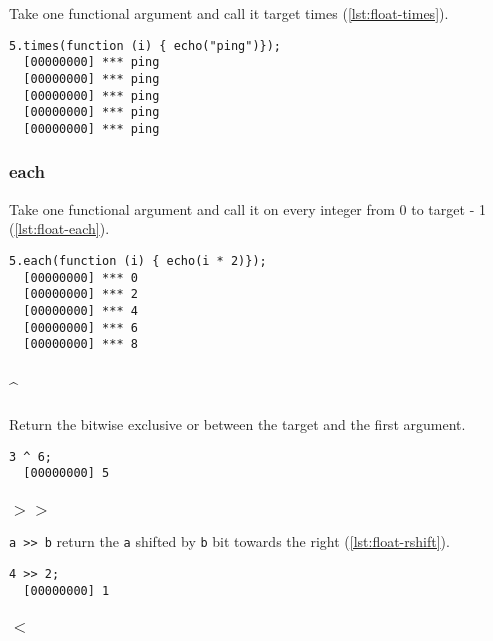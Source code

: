 Take one functional argument and call it target times (\autoref{lst:float-times}).

\begin{lstlisting}[caption=Float.times, label=lst:float-times,
  float=\floatposh]
  5.times(function (i) { echo("ping")});
  [00000000] *** ping
  [00000000] *** ping
  [00000000] *** ping
  [00000000] *** ping
  [00000000] *** ping
\end{lstlisting}

\subsubsection{each}

Take one functional argument and call it on every integer from 0 to
target - 1 (\autoref{lst:float-each}).

\begin{lstlisting}[caption=Float.each, label=lst:float-each,
  float=\floatposh]
  5.each(function (i) { echo(i * 2)});
  [00000000] *** 0
  [00000000] *** 2
  [00000000] *** 4
  [00000000] *** 6
  [00000000] *** 8
\end{lstlisting}

\subsubsection{\^{}}

Return the bitwise exclusive or between the target and the first argument.

\begin{lstlisting}[caption=Float.'\^{}', label=lst:float-bitxor,
  float=\floatposh]
  3 ^ 6;
  [00000000] 5
\end{lstlisting}

\subsubsection{$>>$}

\lstinline|a >> b| return the \lstinline|a| shifted by \lstinline|b|
bit towards the right (\autoref{lst:float-rshift}).

\begin{lstlisting}[caption=Float.'$>>$', label=lst:float-rshift,
  float=\floatposh]
  4 >> 2;
  [00000000] 1
\end{lstlisting}

\subsubsection{$<$}

